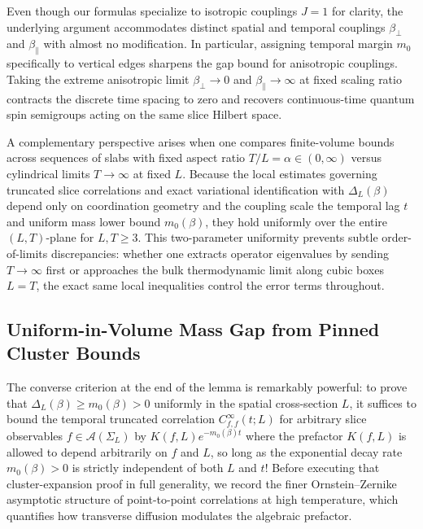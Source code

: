 \documentclass[11pt]{article}
\theoremstyle{definition}
\begin{document}
Even though our formulas specialize to isotropic couplings $J = 1$ for clarity, the
underlying argument accommodates distinct spatial and temporal couplings
$\beta_\perp$ and $\beta_\parallel$ with almost no modification. In particular,
assigning temporal margin $m_0$ specifically to vertical edges sharpens the gap
bound for anisotropic couplings. Taking the extreme anisotropic limit $\beta_\perp
\to 0$ and $\beta_\parallel \to \infty$ at fixed scaling ratio contracts the
discrete time spacing to zero and recovers continuous-time quantum spin semigroups
acting on the same slice Hilbert space.

A complementary perspective arises when one compares finite-volume bounds across
sequences of slabs with fixed aspect ratio $T / L = \alpha \in (0, \infty)$ versus
cylindrical limits $T \to \infty$ at fixed $L$. Because the local estimates
governing truncated slice correlations and exact variational identification with
$\Delta_L(\beta)$ depend only on coordination geometry and the coupling scale the
temporal lag $t$ and uniform mass lower bound $m_0(\beta)$, they hold uniformly over
the entire $(L, T)$-plane for $L, T \ge 3$. This two-parameter uniformity prevents
subtle order-of-limits discrepancies: whether one extracts operator eigenvalues by
sending $T \to \infty$ first or approaches the bulk thermodynamic limit along cubic
boxes $L = T$, the exact same local inequalities control the error terms throughout.

\subsection{Uniform-in-Volume Mass Gap from Pinned Cluster Bounds}
\label{subsec:s08b}

The converse criterion at the end of the lemma is remarkably powerful: to prove that
$\Delta_L(\beta) \ge m_0(\beta) > 0$ uniformly in the spatial cross-section $L$, it
suffices to bound the temporal truncated correlation $C_{f,f}^\infty(t; L)$ for
arbitrary slice observables $f \in \mathcal{A}(\Sigma_L)$ by $K(f, L) e^{-m_0(\beta)
t}$ where the prefactor $K(f, L)$ is allowed to depend arbitrarily on $f$ and $L$,
so long as the exponential decay rate $m_0(\beta) > 0$ is strictly independent of
both $L$ and $t$! Before executing that cluster-expansion proof in full generality,
we record the finer Ornstein--Zernike asymptotic structure of point-to-point
correlations at high temperature, which quantifies how transverse diffusion
modulates the algebraic prefactor.
\end{document}
